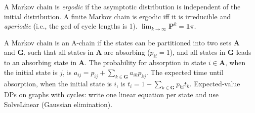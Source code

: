 A Markov chain is \emph{ergodic} if the asymptotic distribution is independent of the initial distribution.
A finite Markov chain is ergodic iff it is irreducible and \emph{aperiodic} (i.e., the gcd of cycle lengths is 1).
$\lim_{k\rightarrow\infty}\mathbf{P}^k = \mathbf{1}\pi$.

A Markov chain is an A-chain if the states can be partitioned into two sets $\mathbf{A}$ and $\mathbf{G}$, such that all states in $\mathbf{A}$ are absorbing ($p_{ii}=1$), and all states in $\mathbf{G}$ leads to an absorbing state in $\mathbf{A}$.
The probability for absorption in state $i\in\mathbf{A}$, when the initial state is $j$, is $a_{ij} = p_{ij}+\sum_{k\in\mathbf{G}} a_{ik}p_{kj}$.
The expected time until absorption, when the initial state is $i$, is $t_i = 1+\sum_{k\in\mathbf{G}}p_{ki}t_k$.
Expected-value DPs on graphs with cycles: write one linear equation per state and use SolveLinear (Gaussian elimination).


